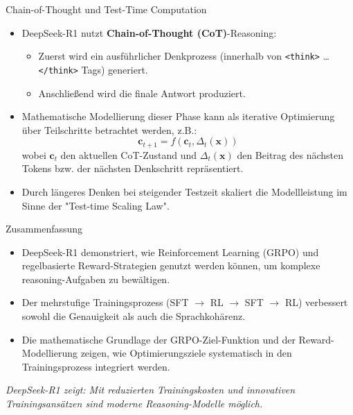 \documentclass[aspectratio=1610, xcolor=dvipsnames, 9pt]{beamer}
\begin{document}
\begin{frame}{Chain-of-Thought und Test-Time Computation}
  \begin{itemize}
      \item DeepSeek-R1 nutzt \textbf{Chain-of-Thought (CoT)}-Reasoning:
          \begin{itemize}
              \item Zuerst wird ein ausführlicher Denkprozess (innerhalb von \texttt{<think>} … \texttt{</think>} Tags) generiert.
              \item Anschließend wird die finale Antwort produziert.
          \end{itemize}
      \item Mathematische Modellierung dieser Phase kann als iterative Optimierung über Teilschritte betrachtet werden, z.B.:
          \[
          \mathbf{c}_{t+1} = f(\mathbf{c}_t, \Delta_t(\mathbf{x}))
          \]
          wobei \(\mathbf{c}_t\) den aktuellen CoT-Zustand und \(\Delta_t(\mathbf{x})\) den Beitrag des nächsten Tokens bzw. der nächsten Denkschritt repräsentiert.
      \item Durch längeres Denken bei steigender Testzeit skaliert die Modellleistung im Sinne der "Test-time Scaling Law".
  \end{itemize}
\end{frame}

\begin{frame}{Zusammenfassung}
  \begin{itemize}
      \item DeepSeek-R1 demonstriert, wie Reinforcement Learning (GRPO) und regelbasierte Reward-Strategien genutzt werden können, um komplexe reasoning-Aufgaben zu bewältigen.
      \item Der mehrstufige Trainingsprozess (SFT $\rightarrow$ RL $\rightarrow$ SFT $\rightarrow$ RL) verbessert sowohl die Genauigkeit als auch die Sprachkohärenz.
      \item Die mathematische Grundlage der GRPO-Ziel-Funktion und der Reward-Modellierung zeigen, wie Optimierungsziele systematisch in den Trainingsprozess integriert werden.
  \end{itemize}
  \vspace{0.3cm}
  \begin{center}
      \textit{DeepSeek-R1 zeigt: Mit reduzierten Trainingskosten und innovativen Trainingsansätzen sind moderne Reasoning-Modelle möglich.}
  \end{center}
\end{frame}
\end{document}
